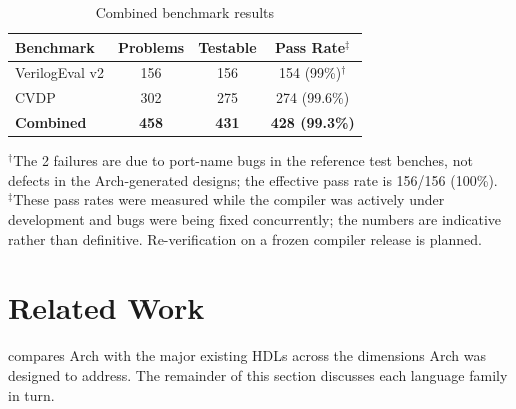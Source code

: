 \documentclass[11pt,twocolumn]{article}
\begin{document}
\begin{table}[t]
\centering
\caption{Combined benchmark results}
\label{tab:combined}
\footnotesize
\begin{tabular}{@{}lccc@{}}
\toprule
\textbf{Benchmark} & \textbf{Problems} & \textbf{Testable} & \textbf{Pass Rate}$^\ddagger$ \\
\midrule
VerilogEval v2 & 156 & 156 & 154 (99\%)$^\dagger$ \\
CVDP & 302 & 275 & 274 (99.6\%) \\
\midrule
\textbf{Combined} & \textbf{458} & \textbf{431} & \textbf{428 (99.3\%)} \\
\bottomrule
\end{tabular}

\vspace{0.5em}
\raggedright\footnotesize
$^\dagger$The 2 failures are due to port-name bugs in the reference test benches, not defects in the Arch-generated designs; the effective pass rate is 156/156 (100\%).\\
$^\ddagger$These pass rates were measured while the compiler was actively under development and bugs were being fixed concurrently; the numbers are indicative rather than definitive. Re-verification on a frozen compiler release is planned.
\end{table}

\section{Related Work}\label{sec:related}

 compares Arch with the major existing HDLs across the dimensions Arch was designed to address. The remainder of this section discusses each language family in turn.
\end{document}
